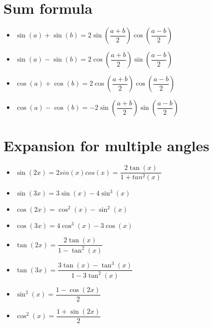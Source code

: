 \documentclass{article}
\begin{document}
\section {Sum formula}
\begin{itemize}
  \item $\sin(a) + \sin(b) = 2\sin\left(\dfrac{a + b}{2}\right)\cos\left(\dfrac{a - b}{2}\right)$
  \item $\sin(a) - \sin(b) = 2\cos\left(\dfrac{a + b}{2}\right)\sin\left(\dfrac{a - b}{2}\right)$
  \item $\cos(a) + \cos(b) = 2\cos\left(\dfrac{a + b}{2}\right)\cos\left(\dfrac{a - b}{2}\right)$
  \item $\cos(a) - \cos(b) = -2\sin\left(\dfrac{a + b}{2}\right)\sin\left(\dfrac{a - b}{2}\right)$
\end{itemize}

\maketitle
\section {Expansion for multiple angles}

\begin{itemize}
  \item $\sin(2x) = 2sin(x)cos(x) = \dfrac{2\tan(x)}{1 + tan^2(x)}$
  \item $\sin(3x) = 3\sin(x) - 4\sin^3(x)$
  \item $\cos(2x) = \cos^2(x) - \sin^2(x)$
  \item $\cos(3x) = 4\cos^3(x) - 3\cos(x)$
  \item $\tan(2x) = \dfrac{2\tan(x)}{1 - \tan^2(x)}$
  \item $\tan(3x) = \dfrac{3\tan(x) - \tan^3(x)}{1 - 3\tan^2(x)}$
  \item $\sin^2(x) = \dfrac{1 - \cos(2x)}{2}$
  \item $\cos^2(x) = \dfrac{1 + \sin(2x)}{2}$  
\end{itemize}

\maketitle
\end{document}
